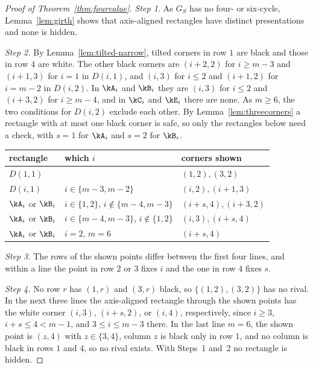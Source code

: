 \begin{proof}[Proof of Theorem~\ref{thm:fourvalue}]
\emph{Step 1.} As $G_S$ has no four- or six-cycle, Lemma~\ref{lem:girth} shows that axis-aligned rectangles have distinct presentations and none is hidden.

\emph{Step 2.} By Lemma~\ref{lem:tilted-narrow}, tilted corners in row $1$ are black and those in row $4$ are white. The other black corners are $(i+2,2)$ for $i\ge m-3$ and $(i+1,3)$ for $i=1$ in $D(i,1)$, and $(i,3)$ for $i\le2$ and $(i+1,2)$ for $i=m-2$ in $D(i,2)$. In $\kA_i$ and $\kB_i$ they are $(i,3)$ for $i\le2$ and $(i+3,2)$ for $i\ge m-4$, and in $\kC_i$ and $\kE_i$ there are none. As $m\ge6$, the two conditions for $D(i,2)$ exclude each other. By Lemma~\ref{lem:threecorners} a rectangle with at most one black corner is safe, so only the rectangles below need a check, with $s=1$ for $\kA_i$ and $s=2$ for $\kB_i$.
\begin{center}\small
\begin{tabular}{@{}lll@{}}
\toprule
rectangle & which $i$ & corners shown\\
\midrule
$D(1,1)$ & & $(1,2),(3,2)$\\
$D(i,1)$ & $i\in\{m-3,m-2\}$ & $(i,2),(i+1,3)$\\
$\kA_i$ or $\kB_i$ & $i\in\{1,2\}$, $i\notin\{m-4,m-3\}$ & $(i+s,4),(i+3,2)$\\
$\kA_i$ or $\kB_i$ & $i\in\{m-4,m-3\}$, $i\notin\{1,2\}$ & $(i,3),(i+s,4)$\\
$\kA_i$ or $\kB_i$ & $i=2$, $m=6$ & $(i+s,4)$\\
\bottomrule
\end{tabular}
\end{center}

\emph{Step 3.} The rows of the shown points differ between the first four lines, and within a line the point in row $2$ or $3$ fixes $i$ and the one in row $4$ fixes $s$.

\emph{Step 4.} No row $r$ has $(1,r)$ and $(3,r)$ black, so $\{(1,2),(3,2)\}$ has no rival. In the next three lines the axis-aligned rectangle through the shown points has the white corner $(i,3)$, $(i+s,2)$, or $(i,4)$, respectively, since $i\ge3$, $i+s\le4<m-1$, and $3\le i\le m-3$ there. In the last line $m=6$, the shown point is $(z,4)$ with $z\in\{3,4\}$, column $z$ is black only in row $1$, and no column is black in rows $1$ and $4$, so no rival exists. With Steps~1 and~2 no rectangle is hidden.
\end{proof}


